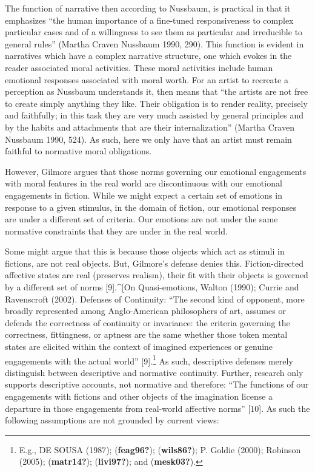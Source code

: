 \documentclass[12pt]{book}
\theoremstyle{definition}
\theoremstyle{remark}
\begin{document}
The function of narrative then according to Nussbaum, is practical in that it emphasizes ``the human importance of a fine-tuned responsiveness to complex particular cases and of a willingness to see them as particular and irreducible to general rules'' (Martha Craven Nussbaum 1990, 290). This function is evident in narratives which have a complex narrative structure, one which evokes in the reader associated moral activities. These moral activities include human emotional responses associated with moral worth. For an artist to recreate a perception as Nussbaum understands it, then means that ``the artists are not free to create simply anything they like. Their obligation is to render reality, precisely and faithfully; in this task they are very much assisted by general principles and by the habits and attachments that are their internalization'' (Martha Craven Nussbaum 1990, 524). As such, here we only have that an artist must remain faithful to normative moral obligations.

However, Gilmore argues that those norms governing our emotional engagements with moral features in the real world are discontinuous with our emotional engagements in fiction. While we might expect a certain set of emotions in response to a given stimulus, in the domain of fiction, our emotional responses are under a different set of criteria. Our emotions are not under the same normative constraints that they are under in the real world.

Some might argue that this is because those objects which act as stimuli in fictions, are not real objects. But, Gilmore's defense denies this. Fiction-directed affective states are real (preserves realism), their fit with their objects is governed by a different set of norms {[}9{]}.\^{}{[}On Quasi-emotions, Walton (1990); Currie and Ravenscroft (2002). Defenses of Continuity: ``The second kind of opponent, more broadly represented among Anglo-American philosophers of art, assumes or defends the correctness of continuity or invariance: the criteria governing the correctness, fittingness, or aptness are the same whether those token mental states are elicited within the context of imagined experiences or genuine engagements with the actual world'' {[}9{]}.\footnote{E.g., DE SOUSA (1987); (\textbf{feag96?}); (\textbf{wils86?}); P. Goldie (2000); Robinson (2005); (\textbf{matr14?}); (\textbf{livi97?}); and (\textbf{mesk03?}).} As such, descriptive defenses merely distinguish between descriptive and normative continuity. Further, research only supports descriptive accounts, not normative and therefore: ``The functions of our engagements with fictions and other objects of the imagination license a departure in those engagements from real-world affective norms'' {[}10{]}. As such the following assumptions are not grounded by current views:
\end{document}
